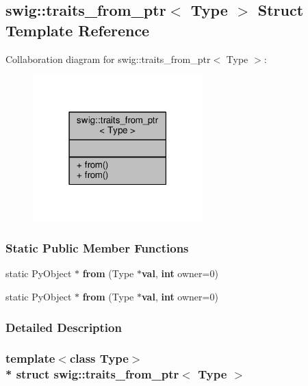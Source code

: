 \subsection{swig\+:\+:traits\+\_\+from\+\_\+ptr$<$ Type $>$ Struct Template Reference}
\label{structswig_1_1traits__from__ptr}


Collaboration diagram for swig\+:\+:traits\+\_\+from\+\_\+ptr$<$ Type $>$\+:
\nopagebreak
\begin{figure}[H]
\begin{center}
\leavevmode
\includegraphics[width=186pt]{da/deb/structswig_1_1traits__from__ptr__coll__graph}
\end{center}
\end{figure}
\subsubsection*{Static Public Member Functions}
\begin{DoxyCompactItemize}
\item 
static Py\+Object $\ast$ {\bf from} (Type $\ast${\bf val}, {\bf int} owner=0)
\item 
static Py\+Object $\ast$ {\bf from} (Type $\ast${\bf val}, {\bf int} owner=0)
\end{DoxyCompactItemize}


\subsubsection{Detailed Description}
\subsubsection*{template$<$class Type$>$\\*
struct swig\+::traits\+\_\+from\+\_\+ptr$<$ Type $>$}



